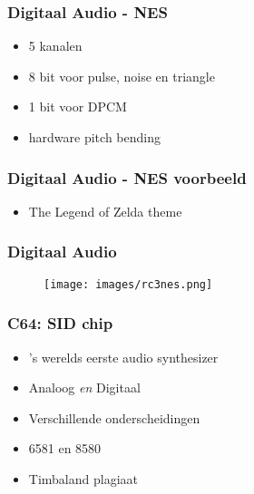 \documentclass[aspectratio=43]{uva-inf-presentation}
\begin{document}

\begin{frame}
\frametitle{Digitaal Audio - NES}

\begin{itemize}
\item 5 kanalen
\item 8 bit voor pulse, noise en triangle
\item 1 bit voor DPCM
\item hardware pitch bending
\end{itemize}

\end{frame}


\begin{frame}
\frametitle{Digitaal Audio - NES voorbeeld}

\begin{itemize}
\item The Legend of Zelda theme
\end{itemize}

\end{frame}


\begin{frame}
\frametitle{Digitaal Audio}

\begin{figure}
\texttt{[image: images/rc3nes.png]}
\end{figure}

\end{frame}


\begin{frame}
\frametitle{C64: SID chip}

\begin{itemize}
\item 's werelds eerste audio synthesizer
\item Analoog \emph{en} Digitaal
\item Verschillende onderscheidingen
\item 6581 en 8580
\item Timbaland plagiaat
\end{itemize}

\end{frame}

\end{document}
